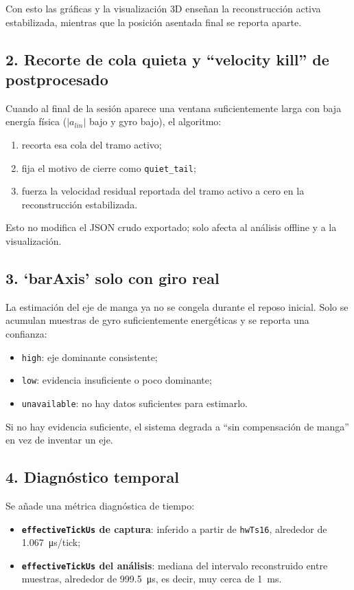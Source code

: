 \documentclass[11pt,a4paper]{article}
\begin{document}
Con esto las gr\'aficas y la visualizaci\'on 3D ense\~nan la reconstrucci\'on activa estabilizada, mientras que la posici\'on asentada final se reporta aparte.

\subsection*{2. Recorte de cola quieta y ``velocity kill'' de postprocesado}
Cuando al final de la sesi\'on aparece una ventana suficientemente larga con baja energ\'ia f\'isica (\(|a_{lin}|\) bajo y gyro bajo), el algoritmo:
\begin{enumerate}[leftmargin=16pt]
  \item recorta esa cola del tramo activo;
  \item fija el motivo de cierre como \texttt{quiet\_tail};
  \item fuerza la velocidad residual reportada del tramo activo a cero en la reconstrucci\'on estabilizada.
\end{enumerate}

Esto no modifica el JSON crudo exportado; solo afecta al an\'alisis offline y a la visualizaci\'on.

\subsection*{3. `barAxis' solo con giro real}
La estimaci\'on del eje de manga ya no se congela durante el reposo inicial. Solo se acumulan muestras de gyro suficientemente energ\'eticas y se reporta una confianza:
\begin{itemize}[leftmargin=14pt]
  \item \texttt{high}: eje dominante consistente;
  \item \texttt{low}: evidencia insuficiente o poco dominante;
  \item \texttt{unavailable}: no hay datos suficientes para estimarlo.
\end{itemize}

Si no hay evidencia suficiente, el sistema degrada a ``sin compensaci\'on de manga'' en vez de inventar un eje.

\subsection*{4. Diagn\'ostico temporal}
Se a\~nade una m\'etrica diagn\'ostica de tiempo:
\begin{itemize}[leftmargin=14pt]
  \item \textbf{\texttt{effectiveTickUs} de captura}: inferido a partir de \texttt{hwTs16}, alrededor de \SI{1,067}{\micro\second}/tick;
  \item \textbf{\texttt{effectiveTickUs} del an\'alisis}: mediana del intervalo reconstruido entre muestras, alrededor de \SI{999,5}{\micro\second}, es decir, muy cerca de \SI{1}{ms}.
\end{itemize}
\end{document}
